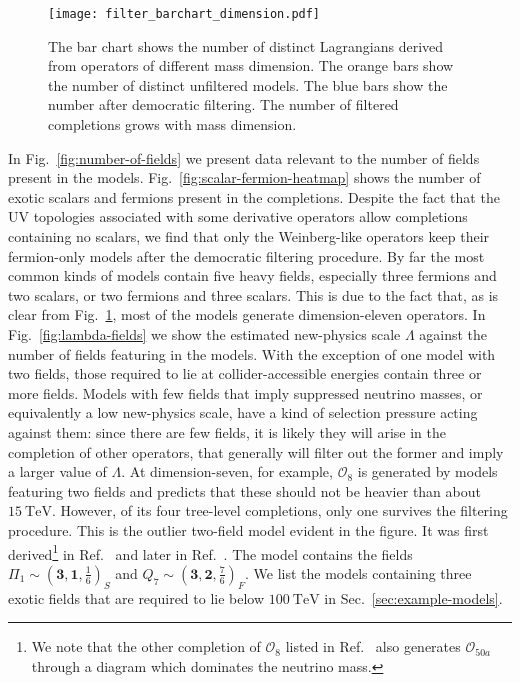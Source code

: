 \begin{figure}[t]
  \centering
  \texttt{[image: filter\_barchart\_dimension.pdf]}
  \caption[The bar chart shows the number of distinct Lagrangians derived from
  operators of different mass dimension.]{The bar chart shows the number of
    distinct Lagrangians derived from operators of different mass dimension. The
    orange bars show the number of distinct unfiltered models. The blue bars
    show the number after democratic filtering. The number of filtered
    completions grows with mass dimension.}
  \label{fig:filter-bar-dimension}
\end{figure}

In Fig.~\ref{fig:number-of-fields} we present data relevant to the number of
fields present in the models. Fig.~\ref{fig:scalar-fermion-heatmap} shows the
number of exotic scalars and fermions present in the completions. Despite the
fact that the UV topologies associated with some derivative operators allow
completions containing no scalars, we find that only the Weinberg-like operators
keep their fermion-only models after the democratic filtering procedure. By far
the most common kinds of models contain five heavy fields, especially three
fermions and two scalars, or two fermions and three scalars. This is due to the
fact that, as is clear from Fig.~\ref{fig:filter-bar-dimension}, most of the
models generate dimension-eleven operators. In Fig.~\ref{fig:lambda-fields} we
show the estimated new-physics scale $\Lambda$ against the number of fields
featuring in the models. With the exception of one model with two fields, those
required to lie at collider-accessible energies contain three or more fields.
Models with few fields that imply suppressed neutrino masses, or equivalently a
low new-physics scale, have a kind of selection pressure acting against them:
since there are few fields, it is likely they will arise in the completion of
other operators, that generally will filter out the former and imply a larger
value of $\Lambda$. At dimension-seven, for example, $\mathcal{O}_{8}$ is
generated by models featuring two fields and predicts that these should not be
heavier than about $\SI{15}{\TeV}$. However, of its four tree-level completions,
only one survives the filtering procedure. This is the outlier two-field model
evident in the figure. It was first derived\footnote{We note that the other
  completion of $\mathcal{O}_{8}$ listed in Ref.~\cite{Cai:2014kra} also
  generates $\mathcal{O}_{50a}$ through a diagram which dominates the neutrino
  mass.} in Ref.~\cite{Cai:2014kra} and later in Ref.~\cite{Klein:2019iws}. The
model contains the fields
$\Pi_{1} \sim (\mathbf{3}, \mathbf{1}, \tfrac{1}{6})_{S}$ and
$Q_{7} \sim (\mathbf{3}, \mathbf{2}, \tfrac{7}{6})_{F}$. We list the models
containing three exotic fields that are required to lie below $\SI{100}{\TeV}$
in Sec.~\ref{sec:example-models}.

